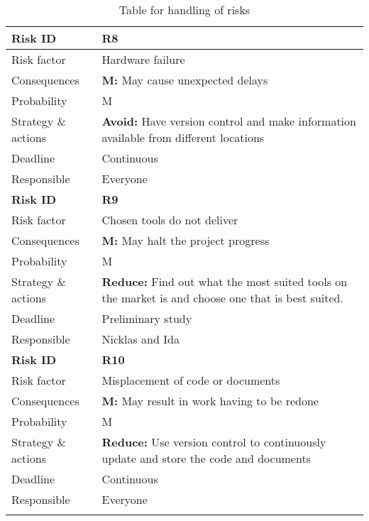 \begin{longtable}{>{\setlength\hsize{.3\hsize}}X|>{\setlength\hsize{0.7\hsize}}X}
\textbf{Risk ID} & \textbf{R8} \\ \hline \hline
Risk factor & Hardware failure \\
Consequences & \textbf{M:} May cause unexpected delays \\
Probability & M \\
Strategy \& actions & \textbf{Avoid:} Have version control and make information available from different locations \\
Deadline & Continuous \\
Responsible & Everyone \\ \hline

\textbf{Risk ID} & \textbf{R9} \\ \hline \hline
Risk factor & Chosen tools do not deliver \\
Consequences & \textbf{M:} May halt the project progress \\
Probability & M \\
Strategy \& actions & \textbf{Reduce:} Find out what the most suited tools on the market is and choose one that is best suited. \\
Deadline & Preliminary study \\
Responsible & Nicklas  and Ida\\ \hline

\textbf{Risk ID} & \textbf{R10} \\ \hline \hline
Risk factor &  Misplacement of code or documents \\
Consequences & \textbf{M:} May result in work having to be redone\\
Probability & M \\
Strategy \& actions & \textbf{Reduce:} Use version control to continuously update and store the code and documents \\
Deadline & Continuous \\
Responsible & Everyone \\ \hline
\hline
\caption{Table for handling of risks} \label{tab:risks}
\end{longtable}